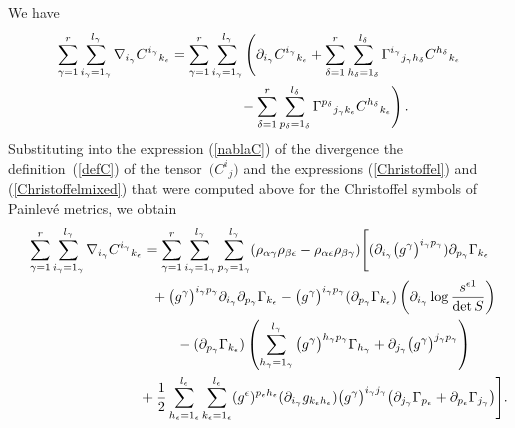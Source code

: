 \documentclass[pdftex]{sigma}
\numberwithin{equation}{section}
\newcommand{\pgamma}{p_{\gamma}}
\newcommand{\igamma}{i_{\gamma}}
\newcommand{\jgamma}{j_{\gamma}}
\newcommand{\lgamma}{l_{\gamma}}
\newcommand{\hgamma}{h_{\gamma}}
\newcommand{\kepsilon}{k_{\epsilon}}
\newcommand{\ldelta}{l_{\delta}}
\newcommand{\pepsilon}{p_{\epsilon}}
\newcommand{\lepsilon}{l_{\epsilon}}
\newcommand{\hepsilon}{h_{\epsilon}}
\newcommand{\hdelta}{h_{\delta}}
\newcommand{\pdelta}{p_{\delta}}
\begin{document}
We have
\begin{gather}
\sum_{\gamma =1}^{r}\sum_{\igamma = 1_{\gamma}}^{\lgamma}\nabla_{\igamma}{C^{\igamma}}_{\kepsilon}=\sum_{\gamma =1}^{r}\sum_{\igamma = 1_{\gamma}}^{\lgamma}\left(\partial_{\igamma}{C^{\igamma}}_{\kepsilon}+\sum_{\delta=1}^{r}\sum_{\hdelta =1_{\delta}}^{\ldelta}{\Gamma^{\igamma}}_{\jgamma \hdelta}{C^{\hdelta}}_{\kepsilon}\right.\nonumber\\
\left.\hphantom{\sum_{\gamma =1}^{r}\sum_{\igamma = 1_{\gamma}}^{\lgamma}\nabla_{\igamma}{C^{\igamma}}_{\kepsilon}=}{}
-\sum_{\delta=1}^{r}\sum_{\pdelta =1_{\delta}}^{\ldelta}{\Gamma^{\pdelta}}_{\jgamma \kepsilon}{C^{\hdelta}}_{\kepsilon}\right).\label{nablaC}
\end{gather}
Substituting into the expression (\ref{nablaC}) of the divergence the definition~(\ref{defC}) of the tensor~$\big({C^{i}}_{j}\big)$ and the expressions (\ref{Christoffel}) and (\ref{Christoffelmixed}) that were computed above for the Christoffel symbols of Painlev\'e metrics, we obtain
\begin{gather}
\sum_{\gamma =1}^{r}\sum_{\igamma = 1_{\gamma}}^{\lgamma}\nabla_{\igamma}{C^{\igamma}}_{\kepsilon} =\sum_{\gamma =1}^{r}\sum_{\igamma = 1_{\gamma}}^{\lgamma}\sum_{\pgamma =1_{\gamma}}^{\lgamma}(\rho_{\alpha \gamma}\rho_{\beta \epsilon}-\rho_{\alpha \epsilon}\rho_{\beta \gamma})\Bigg[(\partial_{\igamma}\big(g^{\gamma}\big)^{\igamma \pgamma})\partial_{\pgamma}\Gamma_{\kepsilon}\nonumber\\
\hphantom{\sum_{\gamma =1}^{r}\sum_{\igamma = 1_{\gamma}}^{\lgamma}\nabla_{\igamma}{C^{\igamma}}_{\kepsilon}=}{}
+\big(g^{\gamma}\big)^{\igamma \pgamma}\partial_{\igamma}\partial_{\pgamma}\Gamma_{\kepsilon} -\big(g^{\gamma}\big)^{\igamma \pgamma}(\partial_{\pgamma}\Gamma_{\kepsilon})\left(\partial_{\igamma}\log \frac{s^{\epsilon 1}}{\det S}\right)\nonumber\\
\hphantom{\sum_{\gamma =1}^{r}\sum_{\igamma = 1_{\gamma}}^{\lgamma}\nabla_{\igamma}{C^{\igamma}}_{\kepsilon}=}{}
-(\partial_{\pgamma}\Gamma_{\kepsilon})\left(\sum_{\hgamma =1_{\gamma}}^{\lgamma}\big(g^{\gamma}\big)^{\hgamma \pgamma}\Gamma_{\hgamma}+\partial_{\jgamma}\big(g^{\gamma}\big)^{\jgamma \pgamma}\right)\nonumber\\
\hphantom{\sum_{\gamma =1}^{r}\sum_{\igamma = 1_{\gamma}}^{\lgamma}\nabla_{\igamma}{C^{\igamma}}_{\kepsilon}=}{}
+\frac{1}{2}\sum_{\hepsilon =1_{\epsilon}}^{\lepsilon}\sum_{\kepsilon=1_{\epsilon}}^{\lepsilon}(g^{\epsilon})^{\pepsilon \hepsilon}(\partial_{\igamma} g_{\kepsilon \hepsilon})\big(g^{\gamma}\big)^{\igamma \jgamma}\big( \partial_{\jgamma}\Gamma_{\pepsilon}+\partial_{\pepsilon}\Gamma_{\jgamma}\big)\Bigg].\label{nablaCint}
\end{gather}
\end{document}
